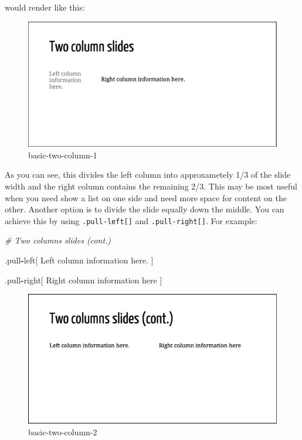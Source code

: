 \documentclass[
]{book}
\newenvironment{Shaded}{\begin{snugshade}}{\end{snugshade}}
\newcommand{\CommentTok}[1]{\textcolor[rgb]{0.37,0.37,0.37}{\textit{#1}}}
\newcommand{\NormalTok}[1]{#1}
\newcommand{\OperatorTok}[1]{\textcolor[rgb]{0.43,0.43,0.43}{\textbf{#1}}}
\begin{document}
would render like this:

\begin{figure}
\centering
\includegraphics{img/02_basics-two-column_1.png}
\caption{basic-two-column-1}
\end{figure}

As you can see, this divides the left column into approxametely 1/3 of the slide width and the right column contains the remaining 2/3. This may be most useful when you need show a list on one side and need more space for content on the other. Another option is to divide the slide equally down the middle. You can achieve this by using \texttt{.pull-left{[}{]}} and \texttt{.pull-right{[}{]}}. For example:

\begin{Shaded}
\begin{Highlighting}[]
\CommentTok{# Two columns slides (cont.)}

\NormalTok{.pull}\OperatorTok{-}\NormalTok{left[}
\NormalTok{Left column information here.}
\NormalTok{]}

\NormalTok{.pull}\OperatorTok{-}\NormalTok{right[}
\NormalTok{Right column information here}
\NormalTok{]}
\end{Highlighting}
\end{Shaded}

\begin{figure}
\centering
\includegraphics{img/02_basics-two-column_2.png}
\caption{basic-two-column-2}
\end{figure}
\end{document}
